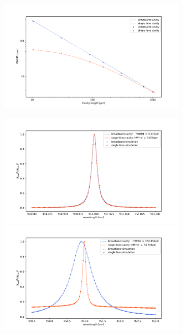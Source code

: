 \begin{figure}[h!]
    \centering
    \begin{subfigure}[c]{0.64\textwidth}
        \centering
        \includegraphics[width=\textwidth]{figures/HWHM_broadband_vs_single_sim.pdf}
        \caption{}
        \label{fig:HWHM_broadband_vs_single_fano}
    \end{subfigure}
    \begin{subfigure}[c]{0.34\textwidth}
        \includegraphics[width=\textwidth]{figures/sim_single_vs_broadband_700um.pdf}
        \caption{}
        \label{fig:700um_broadband_and_single_fano_peak}
        \includegraphics[width=\textwidth]{figures/sim_single_vs_broadband_10um.pdf}

\end{subfigure}
\end{figure}
